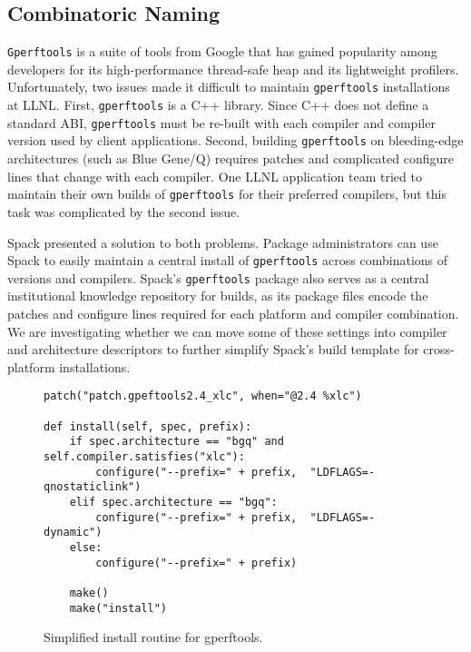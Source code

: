 
\subsection{Combinatoric Naming}
\label{sec:usecase-combinatoric}

{\tt Gperftools} is a suite of tools from Google that has gained popularity among
developers for its high-performance thread-safe heap and its lightweight profilers.
Unfortunately, two issues made it difficult to maintain {\tt gperftools} installations
at LLNL.  First, {\tt gperftools} is a C++ library.  Since C++ does not define a standard
ABI, {\tt gperftools} must be re-built with each compiler and compiler version used by client
applications.  Second, building {\tt gperftools} on bleeding-edge architectures
(such as Blue Gene/Q) requires patches and complicated configure lines that
change with each compiler.  One LLNL application team tried to maintain their own
builds of {\tt gperftools} for their preferred compilers, but this
task was complicated by the second issue.

Spack presented a solution to both problems.  Package administrators can use Spack to
easily maintain a central install of {\tt gperftools} across combinations of
versions and compilers.  Spack's {\tt gperftools} package also serves as a central
institutional knowledge repository for builds, as its package files encode
the patches and configure lines required for each platform and compiler combination.
We are investigating whether we can move some of these settings into compiler and
architecture descriptors to further simplify Spack's build template for cross-platform
installations.
\begin{figure}
\begin{verbatim}
patch("patch.gpeftools2.4_xlc", when="@2.4 %xlc")

def install(self, spec, prefix):
    if spec.architecture == "bgq" and self.compiler.satisfies("xlc"):
        configure("--prefix=" + prefix,  "LDFLAGS=-qnostaticlink")
    elif spec.architecture == "bgq":
        configure("--prefix=" + prefix,  "LDFLAGS=-dynamic")
    else:
        configure("--prefix=" + prefix)

    make()
    make("install")
\end{verbatim}
  \caption{
    Simplified install routine for gperftools.
    \label{fig:gperftools}
  }
\end{figure}

